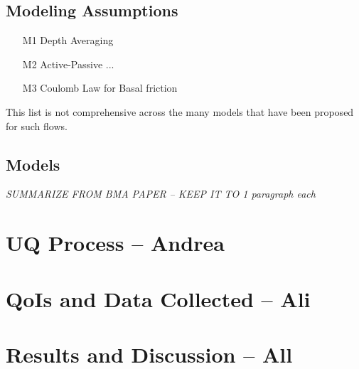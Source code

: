 \documentclass{article}
\begin{document}
\subsection{Modeling Assumptions}
\begin{enumerate}
\item[M1] {Depth Averaging}
\item[M2] {Active-Passive ...}
\item[M3] {Coulomb Law for Basal friction}
\end{enumerate}
This list is not comprehensive across the many models that have been proposed for such flows. 
\subsection{Models}
{\it SUMMARIZE FROM BMA PAPER -- KEEP IT TO 1 paragraph each}
\section{UQ Process -- Andrea}
\section{QoIs and Data Collected -- Ali}
\section{Results and Discussion -- All}

\newpage


\end{document}

